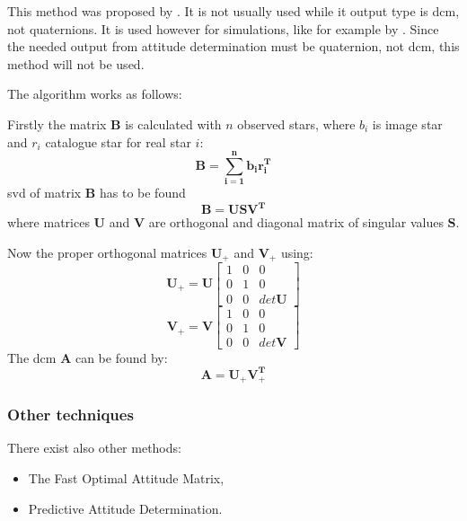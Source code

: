 \documentclass[12pt,a4paper,twoside]{article}
\begin{document}
This method was proposed by \citet{markley1988attitude}. It is not usually used while it output type is \gls{dcm}, not quaternions. It is used however for simulations, like for example by \citet{mcbryde2012star}.
Since the needed output from attitude determination must be quaternion, not \gls{dcm}, this method will not be used.
 
The algorithm works as follows:

Firstly the matrix $\bm{B}$ is calculated with $n$ observed stars, where $b_i$ is image star and $r_i$ catalogue star for real star $i$:
\begin{equation}
\bm{B = \sum_{i=1}^nb_ir_i^T}
\end{equation}
\gls{svd} of matrix $\bm{B}$ has to be found
\begin{equation}
\bm{B = USV^T}
\end{equation}
where matrices $\bm{U}$ and $\bm{V}$ are orthogonal and diagonal matrix of singular values $\bm{S}$.

Now the proper orthogonal matrices $\bm{U}_+$ and $\bm{V}_+$ using:
\begin{equation}
\bm{U}_+ = \bm{U}\begin{bmatrix}
1 & 0 & 0 \\
0 & 1 & 0 \\
0 & 0 & det\bm{U}
\end{bmatrix}
\end{equation}
\begin{equation}
\bm{V}_+ = \bm{V}\begin{bmatrix}
1 & 0 & 0 \\
0 & 1 & 0 \\
0 & 0 & det\bm{V}
\end{bmatrix}
\end{equation}
The \gls{dcm} $\bm{A}$ can be found by:
\begin{equation}
\bm{A = U_+V_+^T}
\end{equation}

\subsubsection{Other techniques}
There exist also other methods:
\begin{itemize}
\item The Fast Optimal Attitude Matrix\cite{markley1993attitude},
\item Predictive Attitude Determination\cite{crassidis1997predictive}.
\end{itemize}
\end{document}
